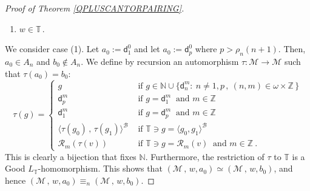 \documentclass[10pt,a4paper, openany,  oldfontcommands]{memoir}
\newtheorem{open problem} [theorem] {Open Problem}
\newtheorem{open question} [theorem] {Open Question}
\begin{document}
\begin{proof}[Proof of  Theorem  \ref{QPLUSCANTORPAIRING}]
\begin{enumerate}
\item $   w     \in   \mathbb{T}    \,       $. 
\end{enumerate}
We consider case (1). 
Let  $  a_0  :=   \mathsf{d}^0_1 $  and  let  $  a_0  :=   \mathsf{d}^0_p  $  where  
$ p  >   \rho_n  \left( n+1  \right)  $. 
Then,    $  a_0   \in  A_n  $  and  $  b_0    \not\in  A_n  $. 
We  define by recursion an   automorphism  $    \tau :  \mathcal{M}   \to   \mathcal{M} $  
such that  $  \tau  \left(   a_0  \right)   =  b_0   $: 
\[
\tau  (  g  )  =  \begin{cases}
g        &   \mbox{ if  }      g  \in  \mathbb{N}  \cup  \big\{ \mathsf{d}^m_n  :   \   n\neq  1,  p   \,  ,    \    (n,m)  \in  \omega  \times  \mathbb{Z}  \,   \rbrace  
\\
 \mathsf{d}^m_p     &     \mbox{  if   }  g  =    \mathsf{d}^m_1     \    \mbox{  and   }    m  \in  \mathbb{Z}
 \\
 \mathsf{d}^m_1     &     \mbox{  if   }  g  =    \mathsf{d}^m_p      \    \mbox{  and   }    m  \in  \mathbb{Z}  
 \\
 \langle  \tau \left(  g_0  \right)    \,  ,  \,    \tau \left(  g_1  \right)   \rangle^{  \mathcal{B} }  
         &   \mbox{  if   }     \mathbb{T}  \ni    g  =  \langle  g_0,  g_1     \rangle^{  \mathcal{B} }   
  \\
\mathcal{R}_m  \left(  \tau \left(  v  \right)     \right)  
         &   \mbox{  if   }   \mathbb{T}  \ni    g  =  \mathcal{R}_m  \left(  v    \right)      \    \mbox{  and   }    m  \in  \mathbb{Z}
         \        .
\end{cases}
\]
This is clearly a bijection that  fixes   $  \mathbb{N} $. 
Furthermore, the restriction of  $  \tau  $  to  $  \mathbb{T} $  is  a  \textsf{Good} $  L_{  \mathbb{T} } $-homomorphism.
This shows that 
 $  \left( \mathcal{M}   \, , \,  w  , a_0     \right)   \simeq   
   \left( \mathcal{M}   \, , \,   w  , b_0    \right)    $, 
 and hence  $  \left( \mathcal{M}   \, , \,    w  , a_0   \right)  \equiv_n     \left( \mathcal{M}   \, , \,   w , b_0   \right)    $.  









\end{proof}
\end{document}
